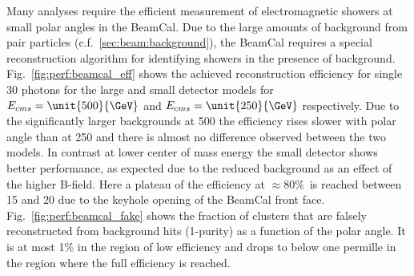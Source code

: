 Many analyses require the efficient measurement of electromagnetic showers at small polar angles in the BeamCal.
Due to the large amounts of background from pair particles (c.f.~\ref{sec:beam:background}), the BeamCal requires a special reconstruction algorithm
for identifying showers in the presence of background.
Fig.~\ref{fig:perf:beamcal_eff} shows the achieved reconstruction efficiency for single \unit{30}{\GeV} photons for the large and small detector models
for $E_{cms}=\unit{500}{\GeV}$  and $E_{cms}=\unit{250}{\GeV}$ respectively. Due to the significantly larger backgrounds at \unit{500}{\GeV} the efficiency
rises slower with polar angle than at \unit{250}{\GeV} and there is almost no difference observed between the two models.
In contrast at lower center of mass energy the small detector shows better performance, as expected due to the reduced background as an effect of the
higher B-field. Here a plateau of the efficiency at $\approx 80\%$~is reached between \unit{15}{\mrad} and \unit{20}{\mrad} due to the keyhole opening
of the BeamCal front face.
Fig.~\ref{fig:perf:beamcal_fake} shows the fraction of clusters that are falsely reconstructed from background hits (1-purity) as a function of the polar angle.
It is at most 1\% in the region of low efficiency and drops to below one permille in the region where the full efficiency is reached.
%
%
